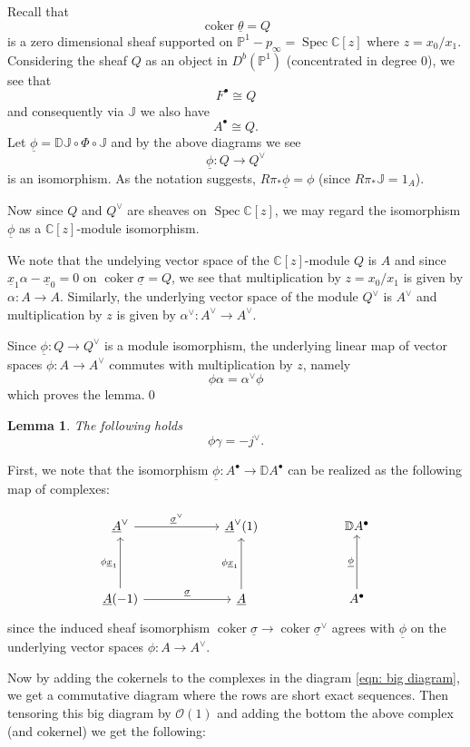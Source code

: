 \documentclass{amsart}
\newtheorem{lemma}[theorem]{Lemma}
\theoremstyle{definition}
\newcommand{\CC} {{\mathbb C}}          %
\newcommand{\DD} {{\mathbb D}}
\newcommand{\JJ} {{\mathbb J}}
\newcommand{\PP}{\mathbb{P}}
\newcommand{\OO}{\mathcal{O}}
\newcommand{\coker}{\operatorname{coker}}
\newcommand{\UL}[1]{\underline{#1}}
\newcommand{\Rpistar}{R\pi_{*}}
\begin{document}
Recall that 
\[
\coker \UL{\theta} = Q
\]
is a zero dimensional sheaf supported on
$\PP^{1}-p_{\infty}=\operatorname{Spec}\CC [z]$ where
$z=x_{0}/x_{1}$. Considering the sheaf $Q$ as an object in
$D^{b}(\PP^{1})$ (concentrated in degree 0), we see that 
\[
F^{\bullet}\cong Q
\]
and consequently via $\JJ$ we also have 
\[
A^{\bullet}\cong Q.
\]
Let $\UL{\phi}=\DD \JJ \circ \Phi \circ \JJ$ and by the above diagrams
we see
\[
\UL{\phi}: Q\longrightarrow Q^{\vee}
\]
is an isomorphism. As the notation suggests, $\Rpistar \UL{\phi}=\phi$
(since $\Rpistar \JJ =1_{A}$).

Now since $Q$ and $Q^{\vee}$ are sheaves on $\operatorname{Spec}\CC
[z]$, we may regard the isomorphism $\UL{\phi }$ as a $\CC [z]$-module
isomorphism.

We note that the undelying vector space of the $\CC [z]$-module $Q$ is
$A$ and since $\UL{x}_{1}\alpha -\UL{x}_{0}=0$ on $\coker
\UL{\sigma}=Q$, we see that multiplication by $z=x_{0}/x_{1}$ is given
by $\alpha :A\to A$. Similarly, the underlying vector space of the
module $Q^{\vee}$ is $A^{\vee}$ and multiplication by $z$ is given by
$\alpha^{\vee}:A^{\vee}\to A^{\vee}$.

Since $\UL{\phi}:Q\to Q^{\vee}$ is a module isomorphism, the
underlying linear map of vector spaces $\phi :A\to A^{\vee}$ commutes
with multiplication by $z$, namely
\[
\phi \alpha =\alpha^{\vee}\phi 
\]
which proves the lemma.\qed 

\begin{lemma}\label{lem: phi.gamma = -jvee}
The following holds
\[
\phi \gamma =-j^{\vee}.
\]
\end{lemma}
\proof
First, we note that the isomorphism $\UL{\phi}:A^{\bullet}\to \DD
A^{\bullet}$ can be realized as the following map of complexes:

\[
\begin{tikzcd}[column sep=6em,row sep=4em]
  \UL{A}^{\vee }
    \arrow[r,"\UL{\sigma}^{\vee}"]
  & \UL{A}^{\vee}(1)
  & \DD A^{\bullet }
  \\
  \UL{A}(-1)
    \arrow[r,"\UL{\sigma  }"]
    \arrow[u,"\phi \UL{x}_{1}"]
  & \UL{A}
    \arrow[u,"\phi \UL{x}_{1}"]
  & A^{\bullet}
    \arrow[u,"\UL{\phi } "]
\end{tikzcd}
\]
since the induced sheaf isomorphism $\coker \UL{\sigma}\to \coker
\UL{\sigma}^{\vee}$ agrees with $\UL{\phi}$ on the underlying vector
spaces $\phi :A\to A^{\vee}$.

Now by adding the cokernels to the complexes in the diagram
\eqref{eqn: big diagram}, we get a commutative diagram where the rows
are short exact sequences. Then tensoring this big diagram by $\OO
(1)$ and adding the bottom the above complex (and cokernel) we get the
following:
\end{document}

